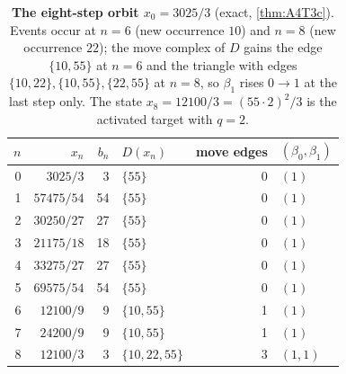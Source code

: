 \begin{table}[tbp]\centering\small
\begin{tabular}{@{}rrrlrl@{}}\toprule
$n$ & $x_n$ & $b_n$ & $D(x_n)$ & move edges & $(\beta_0,\beta_1)$\\\midrule
0 & $3025/3$ & 3 & $\{55\}$ & 0 & $(1)$\\
1 & $57475/54$ & 54 & $\{55\}$ & 0 & $(1)$\\
2 & $30250/27$ & 27 & $\{55\}$ & 0 & $(1)$\\
3 & $21175/18$ & 18 & $\{55\}$ & 0 & $(1)$\\
4 & $33275/27$ & 27 & $\{55\}$ & 0 & $(1)$\\
5 & $69575/54$ & 54 & $\{55\}$ & 0 & $(1)$\\
6 & $12100/9$ & 9 & $\{10,55\}$ & 1 & $(1)$\\
7 & $24200/9$ & 9 & $\{10,55\}$ & 1 & $(1)$\\
8 & $12100/3$ & 3 & $\{10,22,55\}$ & 3 & $(1,1)$\\
\bottomrule\end{tabular}
\caption{\textbf{The eight-step orbit $x_0=3025/3$} (exact, \cref{thm:A4T3c}). Events occur at $n=6$ (new occurrence $10$) and $n=8$ (new occurrence $22$); the move complex of $D$ gains the edge $\{10,55\}$ at $n=6$ and the triangle with edges $\{10,22\},\{10,55\},\{22,55\}$ at $n=8$, so $\beta_1$ rises $0\to1$ at the last step only. The state $x_8=12100/3=(55\cdot2)^2/3$ is the activated target with $q=2$.}\label{tab:t8}
\end{table}
